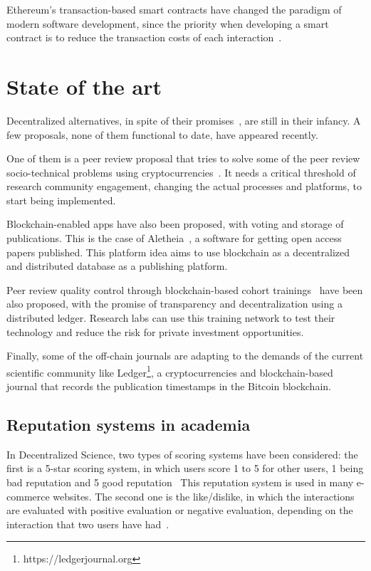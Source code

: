 Ethereum's transaction-based smart contracts have changed the paradigm of modern
software development, since the priority when developing a smart contract is to
reduce the transaction costs of each interaction~\cite{delmolino2016step}.


\section{State of the art}


Decentralized alternatives, in spite of their
promises~\cite{bartlingblockchain}, are still in their infancy. A few proposals,
none of them functional to date, have appeared recently.

One of them is a peer review proposal that tries to solve some of the peer
review socio-technical problems using cryptocurrencies~\cite{tennant2017multi}.
It needs a critical threshold of research community engagement, changing the
actual processes and platforms, to start being implemented.

Blockchain-enabled apps have also been proposed, with voting and storage of
publications. This is the case of Aletheia~\cite{morton2017aletheia}, a software
for getting open access papers published. This platform idea aims to use
blockchain as a decentralized and distributed database as a publishing platform.

Peer review quality control through blockchain-based cohort
trainings~\cite{dhillon2016bench} have been also proposed, with the promise of
transparency and decentralization using a distributed ledger. Research labs can
use this training network to test their technology and reduce the risk for
private investment opportunities.

Finally, some of the off-chain journals are adapting to the demands of the
current scientific community like Ledger\footnote{https://ledgerjournal.org}, a
cryptocurrencies and blockchain-based journal that records the publication
timestamps in the Bitcoin blockchain.

\subsection{Reputation systems in academia}
\label{soa:rs}

In Decentralized Science, two types of scoring systems have been considered: the
first is a 5-star scoring system, in which users score 1 to 5 for other users, 1
being bad reputation and 5 good reputation~\cite{} This reputation system is
used in many e-commerce websites. The second one is the like/dislike, in which
the interactions are evaluated with positive evaluation or negative evaluation,
depending on the interaction that two users have had~\cite{}.


